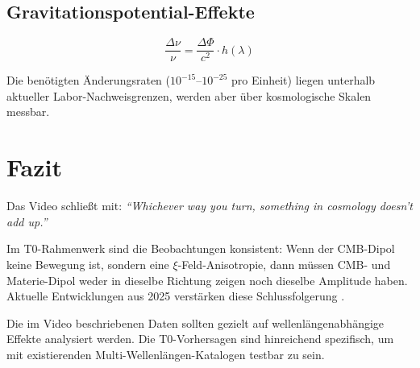 	\subsection{Gravitationspotential-Effekte}
	\begin{equation}
		\frac{\Delta\nu}{\nu} = \frac{\Delta\Phi}{c^2} \cdot h(\lambda)
	\end{equation}

	Die benötigten Änderungsraten ($10^{-15}$--$10^{-25}$ pro Einheit) liegen unterhalb aktueller Labor-Nachweisgrenzen, werden aber über kosmologische Skalen messbar.

\section{Fazit}

	\begin{center}
	\end{center}

	Das Video schließt mit: \textit{``Whichever way you turn, something in cosmology doesn't add up.''}

	Im T0-Rahmenwerk sind die Beobachtungen konsistent: Wenn der CMB-Dipol keine Bewegung ist, sondern eine $\xi$-Feld-Anisotropie, dann müssen CMB- und Materie-Dipol weder in dieselbe Richtung zeigen noch dieselbe Amplitude haben. Aktuelle Entwicklungen aus 2025 verstärken diese Schlussfolgerung \cite{sarkar2025}.

	Die im Video beschriebenen Daten sollten gezielt auf wellenlängenabhängige Effekte analysiert werden. Die T0-Vorhersagen sind hinreichend spezifisch, um mit existierenden Multi-Wellenlängen-Katalogen testbar zu sein.

